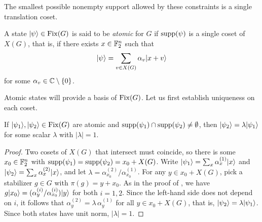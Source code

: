 The smallest possible nonempty support allowed by these constraints is a single translation coset.

\begin{definition}\label{def:atomic}
    A state $|\psi\rangle \in \operatorname{Fix}(G)$ is said to be \emph{atomic} for $G$ if $\operatorname{supp}(\psi)$ is a single coset of $X(G)$, that is, if there exists $x \in \mathbb{F}_2^n$ such that
    \begin{align}
        |\psi\rangle = \sum_{v \in X(G)} \alpha_v |x+v\rangle
    \end{align}
    for some $\alpha_v \in \mathbb{C} \setminus \{0\}$.
\end{definition}

Atomic states will provide a basis of $\operatorname{Fix}(G)$. Let us first establish uniqueness on each coset.

\begin{lemma}\label{lem:atomic-overlap}
    If $|\psi_1\rangle, |\psi_2\rangle \in \operatorname{Fix}(G)$ are atomic and $\operatorname{supp}(\psi_1) \cap \operatorname{supp}(\psi_2) \neq \emptyset$, then $|\psi_2\rangle = \lambda |\psi_1\rangle$ for some scalar $\lambda$ with $|\lambda|=1$.
\end{lemma}
\begin{proof}
    Two cosets of $X(G)$ that intersect must coincide, so there is some $x_0 \in \mathbb{F}_2^n$ with $\operatorname{supp}(\psi_1) = \operatorname{supp}(\psi_2) = x_0 + X(G)$. Write $|\psi_1\rangle = \sum_{x} \alpha^{(1)}_{x} |x\rangle$ and $|\psi_2\rangle = \sum_{x} \alpha^{(2)}_{x} |x\rangle$, and let $\lambda = \alpha^{(2)}_{x_0} / \alpha^{(1)}_{x_0}$. For any $y \in x_0 + X(G)$, pick a stabilizer $g \in G$ with $\pi(g) = y + x_0$. As in the proof of , we have $g|x_0\rangle = (\alpha^{(i)}_{y}/\alpha^{(i)}_{x_0})|y\rangle$ for both $i = 1, 2$. Since the left-hand side does not depend on $i$, it follows that $\alpha^{(2)}_{y} = \lambda\, \alpha^{(1)}_{y}$ for all $y \in x_0 + X(G)$, that is, $|\psi_2\rangle = \lambda |\psi_1\rangle$.
    Since both states have unit norm, $|\lambda|=1$.
\end{proof}


